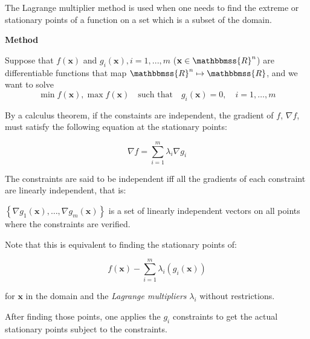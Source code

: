 \documentclass[12pt]{article}
\newcommand{\R}{\mathbbmss{R}}
\begin{document}
The Lagrange multiplier method is used when one needs to find the extreme or stationary points of a function on a set which is a subset of the domain.

{\bf Method}

Suppose that $f(\mathbf{x})$ and $g_{i}(\mathbf{x}), i=1,...,m$ ($\mathbf{x}\in \R^n$) are differentiable functions that map $\R^n \mapsto \R$, and we want to solve 
$$\min f(\mathbf{x}), \max f(\mathbf{x})\quad\mbox{such that}\quad g_{i}(\mathbf{x})=0,\quad i=1,\ldots,m$$

By a calculus theorem, if the constaints are independent, the gradient of $f$, $\nabla f$, must satisfy the following equation at the stationary points:

$$\nabla f = \sum_{i=1}^{m} \lambda_{i} \nabla g_{i}$$

The constraints are said to be independent iff all the gradients of each constraint are linearly independent, that is:

$\left \{\nabla g_{1}(\mathbf{x}), \ldots, \nabla g_{m}(\mathbf{x})\right \}$ is a set of linearly independent vectors on all points where the constraints are verified.


Note that this is equivalent to finding the stationary points of:

$$f(\mathbf{x})-\sum_{i=1}^{m} \lambda_{i}( g_{i}(\mathbf{x}))$$

for $\mathbf{x}$ in the domain and the \emph{Lagrange multipliers} $\lambda_{i}$ without restrictions.

After finding those points, one applies the $g_i$ constraints to get the actual stationary points subject to the constraints.
\end{document}
